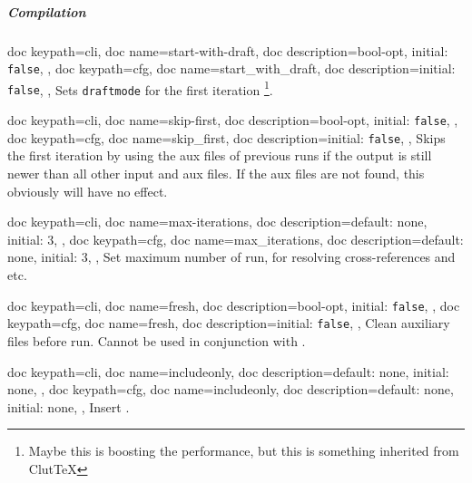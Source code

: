\documentclass[a4paper, 11pt]{scrartcl}
\let\TeXold\TeX
\renewcommand\TeX{\TeXold\xspace}
\begin{document}
\subparagraph{Compilation}
\begin{docKeys}[
	]{
		{
			doc keypath=cli,
			doc name=start-with-draft,
			doc description={bool-opt, initial: \texttt{false}},
		},
		{
			doc keypath=cfg,
			doc name=start_with_draft,
			doc description={initial: \texttt{false}},
		},
	}
	Sets \texttt{draftmode} for the first iteration
	\footnote{Maybe this is boosting the performance, but this is something inherited from Clut\TeX}.
\end{docKeys}
\begin{docKeys}[
	]{
		{
			doc keypath=cli,
			doc name=skip-first,
			doc description={bool-opt, initial: \texttt{false}},
		},
		{
			doc keypath=cfg,
			doc name=skip_first,
			doc description={initial: \texttt{false}},
		},
	}
	Skips the first iteration by using the aux files of previous runs if the output is still newer than all other input and aux files.
	If the aux files are not found, this obviously will have no effect.
\end{docKeys}
\begin{docKeys}[
		doc parameter={=\meta{max\_iterations}},
	]{
		{
			doc keypath=cli,
			doc name=max-iterations,
			doc description={default: none, initial: 3},
		},
		{
			doc keypath=cfg,
			doc name=max_iterations,
			doc description={default: none, initial: 3},
		},
	}
	Set maximum number of run, for resolving cross-references and etc.
\end{docKeys}
\begin{docKeys}[
	]{
		{
			doc keypath=cli,
			doc name=fresh,
			doc description={bool-opt, initial: \texttt{false}},
		},
		{
			doc keypath=cfg,
			doc name=fresh,
			doc description={initial: \texttt{false}},
		},
	}
	Clean auxiliary files before run.
	Cannot be used in conjunction with .
\end{docKeys}
\begin{docKeys}[
		doc parameter={=\meta{includeonly}},
	]{
		{
			doc keypath=cli,
			doc name=includeonly,
			doc description={default: none, initial: none},
		},
		{
			doc keypath=cfg,
			doc name=includeonly,
			doc description={default: none, initial: none},
		},
	}
	Insert .
\end{docKeys}
\end{document}
